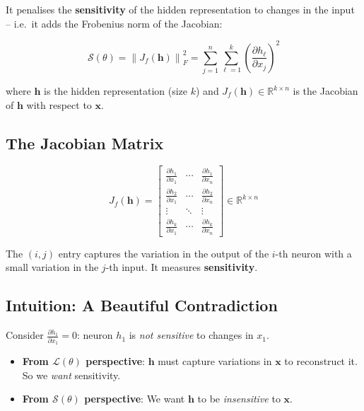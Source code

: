 \documentclass[12pt,a4paper]{article}
\newcommand{\R}{\mathbb{R}}
\newcommand{\norm}[1]{\left\|#1\right\|}
\newcommand{\vx}{\mathbf{x}}
\newcommand{\vh}{\mathbf{h}}
\newcommand{\Loss}{\mathcal{L}}
\newcommand{\Reg}{\mathcal{S}}
\begin{document}
It penalises the \textbf{sensitivity} of the hidden representation to changes in the input -- i.e.\ it adds the Frobenius norm of the Jacobian:

\[
  \Reg(\theta) = \norm{J_f(\vh)}_F^2
  = \sum_{j=1}^{n}\sum_{\ell=1}^{k}
    \left(\frac{\partial h_\ell}{\partial x_j}\right)^2
\]

where $\vh$ is the hidden representation (size $k$) and $J_f(\vh) \in \R^{k\times n}$ is the Jacobian of $\vh$ with respect to $\vx$.

\subsection{The Jacobian Matrix}

\[
  J_f(\vh)
  = \begin{bmatrix}
      \frac{\partial h_1}{\partial x_1} & \cdots & \frac{\partial h_1}{\partial x_n}\\
      \frac{\partial h_2}{\partial x_1} & \cdots & \frac{\partial h_2}{\partial x_n}\\
      \vdots & \ddots & \vdots\\
      \frac{\partial h_k}{\partial x_1} & \cdots & \frac{\partial h_k}{\partial x_n}
    \end{bmatrix}
  \in \R^{k\times n}
\]

The $(i,j)$ entry captures the variation in the output of the $i$-th neuron with a small variation in the $j$-th input. It measures \textbf{sensitivity}.

\subsection{Intuition: A Beautiful Contradiction}

Consider $\frac{\partial h_1}{\partial x_1} = 0$: neuron $h_1$ is \emph{not sensitive} to changes in $x_1$.

\begin{itemize}
  \item \textbf{From $\Loss(\theta)$ perspective}: $\vh$ must capture variations in $\vx$ to reconstruct it. So we \emph{want} sensitivity.
  \item \textbf{From $\Reg(\theta)$ perspective}: We want $\vh$ to be \emph{insensitive} to $\vx$.
\end{itemize}
\end{document}
